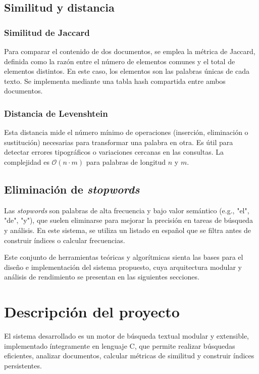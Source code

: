 \documentclass[9pt,letterpaper,onecolumn]{rho-class/rho}
\begin{document}
\subsection{Similitud y distancia}

\subsubsection*{Similitud de Jaccard}

Para comparar el contenido de dos documentos, se emplea la métrica de Jaccard, definida como la razón entre el número de elementos comunes y el total de elementos distintos. En este caso, los elementos son las palabras únicas de cada texto. Se implementa mediante una tabla hash compartida entre ambos documentos.

\subsubsection*{Distancia de Levenshtein}

Esta distancia mide el número mínimo de operaciones (inserción, eliminación o sustitución) necesarias para transformar una palabra en otra. Es útil para detectar errores tipográficos o variaciones cercanas en las consultas. La complejidad es $\mathcal{O}(n \cdot m)$ para palabras de longitud $n$ y $m$.

\subsection{Eliminación de \textit{stopwords}}

Las \textit{stopwords} son palabras de alta frecuencia y bajo valor semántico (e.g., "el", "de", "y"), que suelen eliminarse para mejorar la precisión en tareas de búsqueda y análisis. En este sistema, se utiliza un listado en español que se filtra antes de construir índices o calcular frecuencias.

\vspace{0.5em}
Este conjunto de herramientas teóricas y algorítmicas sienta las bases para el diseño e implementación del sistema propuesto, cuya arquitectura modular y análisis de rendimiento se presentan en las siguientes secciones.


\section{Descripción del proyecto}
\label{sec:implementacion}

El sistema desarrollado es un motor de búsqueda textual modular y extensible, implementado íntegramente en lenguaje C, que permite realizar búsquedas eficientes, analizar documentos, calcular métricas de similitud y construir índices persistentes.
\end{document}
